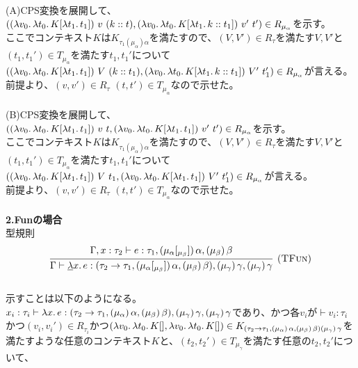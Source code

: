 \\
(A)CPS変換を展開して、\\
$(\LamP{v_0}{\Lam{t_0}{K[\Lam{t_1}{t_1}]}}\ v\ \ConsP{k}{t}, \LamP{v_0}{\Lam{t_0}{K[\Lam{t_1}{\Cons{k}{t_1}}]}}\ v'\ t')\in R_{\mu_{\alpha}}$を示す。\\
ここでコンテキスト$K$は$K_{\tau_1(\mu_{\alpha})\alpha}$を満たすので、$(V,V')\in R_{\tau}$を満たす$V,V'$と$(t_1, t_1')\in T_{\mu_{\alpha}}$を満たす$t_1, t_1'$について\\
$(\LamP{v_0}{\Lam{t_0}{K[\Lam{t_1}{t_1}]}}\ V\ \ConsP{k}{t_1}, \LamP{v_0}{\Lam{t_0}{K[\Lam{t_1}{\Cons{k}{t_1}}]}}\ V'\ t_1')\in R_{\mu_{\alpha}}$が言える。\\
前提より、$(v,v')\in R_{\tau}$ $(t, t') \in T_{\mu_{\alpha}}$なので示せた。\\
\\
(B)CPS変換を展開して、\\
$(\LamP{v_0}{\Lam{t_0}{K[\Lam{t_1}{t_1}]}}\ v\ t, \LamP{v_0}{\Lam{t_0}{K[\Lam{t_1}{t_1}]}}\ v'\ t')\in R_{\mu_{\alpha}}$を示す。\\
ここでコンテキスト$K$は$K_{\tau_1(\mu_{\alpha})\alpha}$を満たすので、$(V,V')\in R_{\tau}$を満たす$V,V'$と$(t_1, t_1')\in T_{\mu_{\alpha}}$を満たす$t_1, t_1'$について\\
$(\LamP{v_0}{\Lam{t_0}{K[\Lam{t_1}{t_1}]}}\ V\ t_1, \LamP{v_0}{\Lam{t_0}{K[\Lam{t_1}{t_1}]}}\ V'\ t_1')\in R_{\mu_{\alpha}}$が言える。\\
前提より、$(v,v')\in R_{\tau}$ $(t, t') \in T_{\mu_{\alpha}}$なので示せた。\\
\\
\textbf{2.Funの場合}\\
型規則
\[
\begin{array}{c}
\infer[\TFun]
      {\JudgeTrail{\Gamma}{\DLam{x}{e}}
                  {\ArrowTrailP{\tau_2}{\tau_1}
                               {\TrailsType{\alpha}{\beta}}
                               {\TrailType{\beta}}}
                  {\TrailType{\gamma}}
                  {\TrailType{\gamma}}}
      {\JudgeTrail{\Gamma,x:\tau_2}{e}{\tau_1}
                  {\TrailsType{\alpha}{\beta}}
                  {\TrailType{\beta}}}
\end{array}
\]
\\
示すことは以下のようになる。\\
$x_i:\tau_i \vdash \lambda{x}.\,{e}:(\tau_2\rightarrow{\tau_1},(\mu_{\alpha})\,\alpha,(\mu_{\beta})\,\beta), (\mu_{\gamma})\,\gamma, (\mu_{\gamma})\,\gamma$であり、かつ各$v_i$が$\vdash v_i:\tau_i$かつ$(v_i,v_i') \in R_{\tau_i}$かつ$(\lambda{v_0}.\,{\lambda{t_0}.\,{K[]}}, \lambda{v_0}.\,{\lambda{t_0}.\,{K[]}})\in  K_{(\tau_2\rightarrow{\tau_1},(\mu_{\alpha})\,\alpha,(\mu_{\beta})\,\beta) (\mu_{\gamma})\,\gamma}$を満たすような任意のコンテキスト$K$と、$(t_2, t_2') \in T_{\mu_{\gamma}}$を満たす任意の$t_2, t_2'$について、\\
